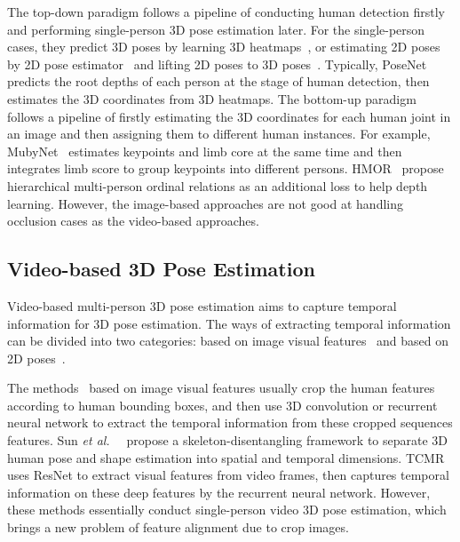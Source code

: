 \documentclass[sigconf]{acmart}
\newcommand{\etal}{\textit{et al.~}}
\begin{document}
The top-down paradigm follows a pipeline of conducting human detection firstly and performing single-person 3D pose estimation later. For the single-person cases, they predict 3D poses by learning 3D heatmaps~\cite{moon2019camera}, or estimating 2D poses by 2D pose estimator~\cite{qiu2019learning,qiu2020dgcn} and lifting 2D poses to 3D poses~\cite{zeng2020srnet}. Typically, PoseNet~\cite{moon2019camera} predicts the root depths of each person at the stage of human detection, then estimates the 3D coordinates from 3D heatmaps. The bottom-up paradigm~\cite{zanfir2018deep,wang2020hmor,zhen2020smap} follows a pipeline of firstly estimating the 3D coordinates for each human joint in an image and then assigning them to different human instances. For example, MubyNet~\cite{zanfir2018deep} estimates keypoints and limb core at the same time and then integrates limb score to group keypoints into different persons. HMOR~\cite{wang2020hmor} propose hierarchical multi-person ordinal relations as an additional loss to help depth learning. However, the image-based approaches are not good at handling occlusion cases as the video-based approaches.

\subsection{Video-based 3D Pose Estimation}
Video-based multi-person 3D pose estimation aims to capture temporal information for 3D pose estimation. The ways of extracting temporal information can be divided into two categories: based on image visual features~\cite{sun2019human,kocabas2020vibe,choi2021beyond} and based on 2D poses~\cite{arnab2019exploiting,cai2019exploiting,zheng20213d}.

The methods~\cite{sun2019human,kocabas2020vibe,choi2021beyond} based on image visual features usually crop the human features according to human bounding boxes, and then use 3D convolution or recurrent neural network to extract the temporal information from these cropped sequences features. Sun \etal~\cite{sun2019human} propose a skeleton-disentangling framework to separate 3D human pose and shape estimation into spatial and temporal dimensions. TCMR~\cite{choi2021beyond} uses ResNet to extract visual features from video frames, then captures temporal information on these deep features by the recurrent neural network. However, these methods essentially conduct single-person video 3D pose estimation, which brings a new problem of feature alignment due to crop images. 
\end{document}
